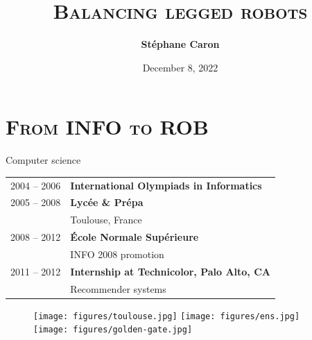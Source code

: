 \documentclass[9pt, aspectratio=43]{beamer}
\title{
    \textsc{Balancing legged robots}
}
\author{\textbf{St\'ephane Caron}}
\date{December 8, 2022}
\newcommand{\highlight}[1]{{\color{hlcolor} \textbf{#1}}}
\begin{document}
\maketitle


\section*{\textsc{From INFO to ROB}}


\begin{frame}{Computer science}
    \begin{tabular}{ll}
        2004 – 2006 & \highlight{International Olympiads in Informatics}
        \vspace{.1em} \\ 
        2005 – 2008 & \highlight{Lyc\'{e}e \& Pr\'{e}pa}
        \vspace{.1em} \\ & Toulouse, France
        \vspace{0.7em}
        \\
        2008 – 2012 & \highlight{\'Ecole Normale Supérieure}
        \vspace{.1em} \\ & INFO 2008 promotion
        \vspace{0.7em}
        \\
        2011 – 2012 & \highlight{Internship at Technicolor, Palo Alto, CA}
        \vspace{.1em} \\ & Recommender systems
        \newline
    \end{tabular}
    \begin{figure}
        \vspace{0.5em}
        \texttt{[image: figures/toulouse.jpg]} \hspace{0.1em}
        \texttt{[image: figures/ens.jpg]} \hspace{0.1em}
        \texttt{[image: figures/golden-gate.jpg]}
        \vspace{-3em}
    \end{figure}
\end{frame}
\end{document}
